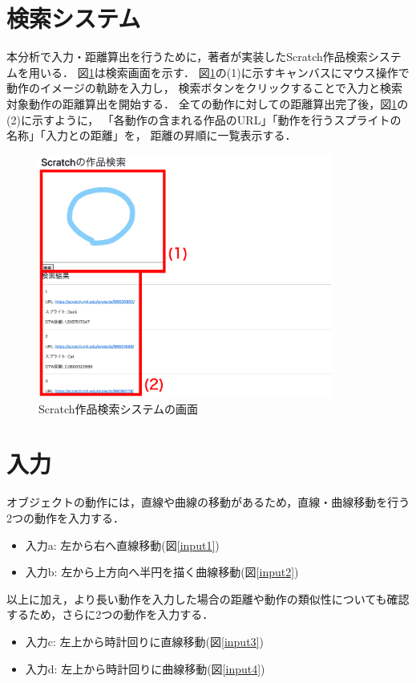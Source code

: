 \documentclass[11pt]{jreport}
\begin{document}
\section{検索システム}
本分析で入力・距離算出を行うために，著者が実装したScratch作品検索システムを用いる．
図\ref{systemdisplay}は検索画面を示す．
図\ref{systemdisplay}の(1)に示すキャンバスにマウス操作で動作のイメージの軌跡を入力し，
検索ボタンをクリックすることで入力と検索対象動作の距離算出を開始する．
全ての動作に対しての距離算出完了後，図\ref{systemdisplay}の(2)に示すように，
「各動作の含まれる作品のURL」「動作を行うスプライトの名称」「入力との距離」を，
距離の昇順に一覧表示する．

\begin{figure}[H]
    \centering
    \includegraphics[height=8cm]{systemdisplay.eps}
    \caption{Scratch作品検索システムの画面}
    \label{systemdisplay}
\end{figure}

\section{入力}
オブジェクトの動作には，直線や曲線の移動があるため，直線・曲線移動を行う2つの動作を入力する．

\begin{itemize}
    \item 入力a: 左から右へ直線移動(図\ref{input1})
    \item 入力b: 左から上方向へ半円を描く曲線移動(図\ref{input2})
\end{itemize}

以上に加え，より長い動作を入力した場合の距離や動作の類似性についても確認するため，さらに2つの動作を入力する．

\begin{itemize}
    \item 入力c: 左上から時計回りに直線移動(図\ref{input3})
    \item 入力d: 左上から時計回りに曲線移動(図\ref{input4})
\end{itemize}
\end{document}
